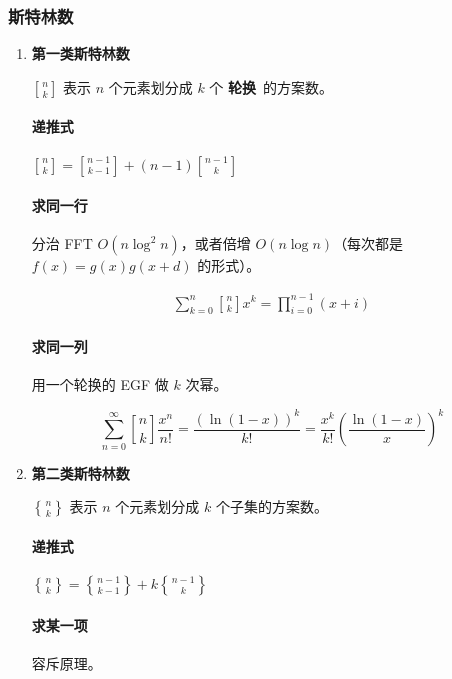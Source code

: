 \documentclass[a4paper, twoside]{article}
\begin{document}
    \subsubsection{斯特林数}
    \begin{enumerate}

        \item \textbf{第一类斯特林数}
        
        $n\brack k$ 表示 $n$ 个元素划分成 $k$ 个 \textbf{轮换}\ 的方案数。
        
        \paragraph{递推式} ${n \brack k} = {n-1 \brack k-1} + (n-1){n-1 \brack k}$
        
        \paragraph{求同一行} 分治 FFT $O(n\log ^2 n)$，或者倍增 $O(n\log n)$（每次都是 $f(x) = g(x) g(x + d)$ 的形式）。
        
        $$ \begin{aligned} \sum_{k = 0} ^ n {n \brack k} x^k = \prod_{i = 0} ^ {n - 1} (x + i) \end{aligned} $$
        
        \paragraph{求同一列} 用一个轮换的 EGF 做 $k$ 次幂。
        
        $$ \sum_{n = 0} ^ \infty {n \brack k} \frac {x ^ n} {n!} = \frac {\left(\ln (1 - x)\right) ^ k} {k!} = \frac {x ^ k} {k!} \left( \frac {\ln (1 - x)} x \right) ^ k $$
        
        \item \textbf{第二类斯特林数}
        
        $n\brace k$ 表示 $n$ 个元素划分成 $k$ 个子集的方案数。
        
        \paragraph{递推式} ${n \brace k} = {n-1 \brace k-1} + k{n-1 \brace k}$
        
        \paragraph{求某一项} 容斥原理。
        

\end{enumerate}
\end{document}
